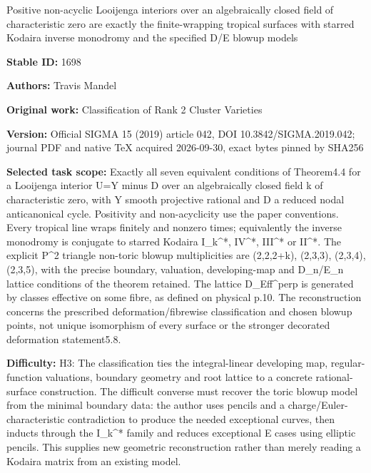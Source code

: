 \documentclass[11pt]{article}
\numberwithin{equation}{section}
\numberwithin{figure}{section}
\numberwithin{table}{section}
\theoremstyle{definition}
\begin{document}
\begin{center}\Large Positive non-acyclic Looijenga interiors over an algebraically closed field of characteristic zero are exactly the finite-wrapping tropical surfaces with starred Kodaira inverse monodromy and the specified D/E blowup models\end{center}
\noindent\textbf{Stable ID:} 1698\par
\noindent\textbf{Authors:} Travis Mandel\par
\noindent\textbf{Original work:} Classification of Rank 2 Cluster Varieties\par
\noindent\textbf{Version:} Official SIGMA 15 (2019) article 042, DOI 10.3842/SIGMA.2019.042; journal PDF and native TeX acquired 2026-09-30, exact bytes pinned by SHA256\par
\noindent\textbf{Selected task scope:} Exactly all seven equivalent conditions of Theorem4.4 for a Looijenga interior U=Y minus D over an algebraically closed field k of characteristic zero, with Y smooth projective rational and D a reduced nodal anticanonical cycle. Positivity and non-acyclicity use the paper conventions. Every tropical line wraps finitely and nonzero times; equivalently the inverse monodromy is conjugate to starred Kodaira I\_k\textasciicircum{}*, IV\textasciicircum{}*, III\textasciicircum{}* or II\textasciicircum{}*. The explicit P\textasciicircum{}2 triangle non-toric blowup multiplicities are (2,2,2+k), (2,3,3), (2,3,4), (2,3,5), with the precise boundary, valuation, developing-map and D\_n/E\_n lattice conditions of the theorem retained. The lattice D\_Eff\textasciicircum{}perp is generated by classes effective on some fibre, as defined on physical p.10. The reconstruction concerns the prescribed deformation/fibrewise classification and chosen blowup points, not unique isomorphism of every surface or the stronger decorated deformation statement5.8.\par
\noindent\textbf{Difficulty:} H3: The classification ties the integral-linear developing map, regular-function valuations, boundary geometry and root lattice to a concrete rational-surface construction. The difficult converse must recover the toric blowup model from the minimal boundary data: the author uses pencils and a charge/Euler-characteristic contradiction to produce the needed exceptional curves, then inducts through the I\_k\textasciicircum{}* family and reduces exceptional E cases using elliptic pencils. This supplies new geometric reconstruction rather than merely reading a Kodaira matrix from an existing model.\par
\end{document}
